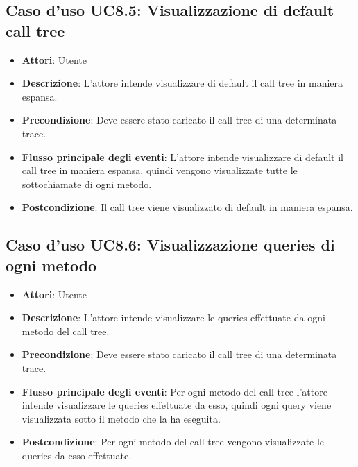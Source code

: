 \subsection{Caso d'uso UC8.5: Visualizzazione di default call tree}
\begin{itemize}
\item \textbf{Attori}: Utente
\item \textbf{Descrizione}: L'attore intende visualizzare di default il call tree in maniera espansa.
\item \textbf{Precondizione}: Deve essere stato caricato il call tree di una determinata trace.
\item \textbf{Flusso principale degli eventi}: L'attore intende visualizzare di default il call tree in maniera espansa, quindi vengono visualizzate tutte le sottochiamate di ogni metodo.
\item \textbf{Postcondizione}: Il call tree viene visualizzato di default in maniera espansa.
\end{itemize}
\subsection{Caso d'uso UC8.6: Visualizzazione queries di ogni metodo}
\begin{itemize}
\item \textbf{Attori}: Utente
\item \textbf{Descrizione}: L'attore intende visualizzare le queries effettuate da ogni metodo del call tree.
\item \textbf{Precondizione}: Deve essere stato caricato il call tree di una determinata trace.
\item \textbf{Flusso principale degli eventi}: Per ogni metodo del call tree l'attore intende visualizzare le queries effettuate da esso, quindi ogni query viene visualizzata sotto il metodo che la ha eseguita.
\item \textbf{Postcondizione}: Per ogni metodo del call tree vengono visualizzate le queries da esso effettuate.
\end{itemize}
